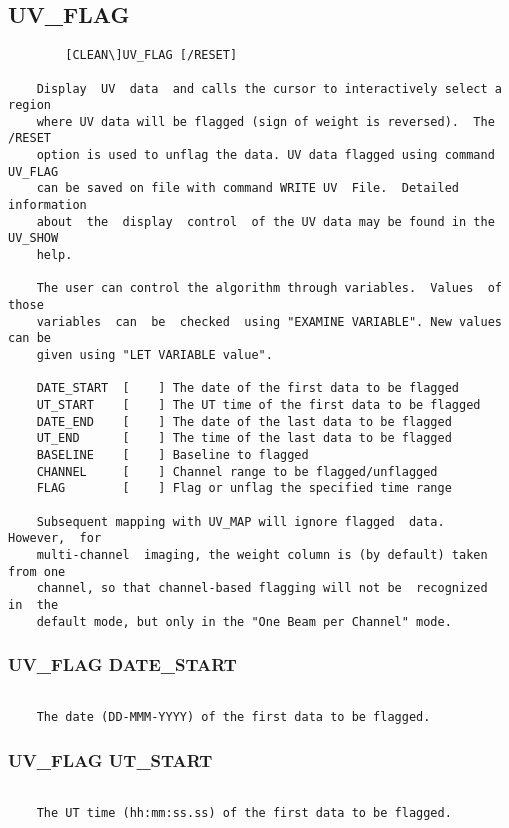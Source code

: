 \subsection{UV\_FLAG}
\begin{verbatim}
        [CLEAN\]UV_FLAG [/RESET]

    Display  UV  data  and calls the cursor to interactively select a region
    where UV data will be flagged (sign of weight is reversed).  The  /RESET
    option is used to unflag the data. UV data flagged using command UV_FLAG
    can be saved on file with command WRITE UV  File.  Detailed  information
    about  the  display  control  of the UV data may be found in the UV_SHOW
    help.

    The user can control the algorithm through variables.  Values  of  those
    variables  can  be  checked  using "EXAMINE VARIABLE". New values can be
    given using "LET VARIABLE value".

    DATE_START  [    ] The date of the first data to be flagged
    UT_START    [    ] The UT time of the first data to be flagged
    DATE_END    [    ] The date of the last data to be flagged
    UT_END      [    ] The time of the last data to be flagged
    BASELINE    [    ] Baseline to flagged
    CHANNEL     [    ] Channel range to be flagged/unflagged
    FLAG        [    ] Flag or unflag the specified time range

    Subsequent mapping with UV_MAP will ignore flagged  data.  However,  for
    multi-channel  imaging, the weight column is (by default) taken from one
    channel, so that channel-based flagging will not be  recognized  in  the
    default mode, but only in the "One Beam per Channel" mode.

\end{verbatim}
\subsubsection{UV\_FLAG DATE\_START}
\begin{verbatim}

    The date (DD-MMM-YYYY) of the first data to be flagged.

\end{verbatim}
\subsubsection{UV\_FLAG UT\_START}
\begin{verbatim}

    The UT time (hh:mm:ss.ss) of the first data to be flagged.

\end{verbatim}

